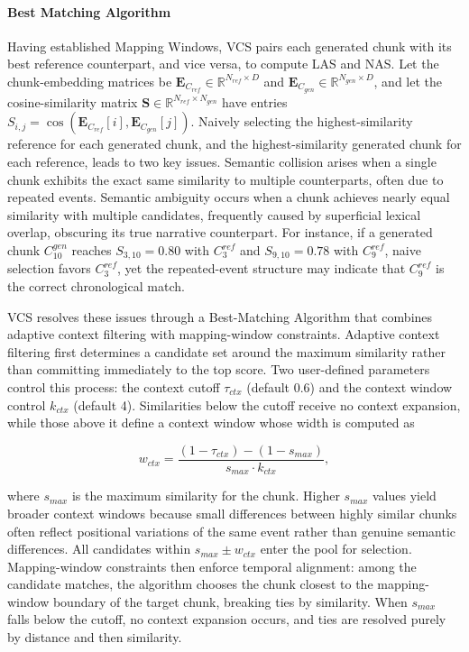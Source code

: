 \documentclass[letterpaper]{article} %
\begin{document}
\paragraph{Best Matching Algorithm}
Having established Mapping Windows, VCS pairs each generated chunk with its best reference counterpart, and vice versa, to compute LAS and NAS. Let the chunk-embedding matrices be $\mathbf{E}_{C_{ref}} \in \mathbb{R}^{N_{ref} \times D}$ and $\mathbf{E}_{C_{gen}} \in \mathbb{R}^{N_{gen} \times D}$, and let the cosine-similarity matrix $\mathbf{S} \in \mathbb{R}^{N_{ref} \times N_{gen}}$ have entries $S_{i,j} = \cos(\mathbf{E}_{C_{ref}}[i], \mathbf{E}_{C_{gen}}[j])$. Naively selecting the highest-similarity reference for each generated chunk, and the highest-similarity generated chunk for each reference, leads to two key issues. Semantic collision arises when a single chunk exhibits the exact same similarity to multiple counterparts, often due to repeated events. Semantic ambiguity occurs when a chunk achieves nearly equal similarity with multiple candidates, frequently caused by superficial lexical overlap, obscuring its true narrative counterpart. For instance, if a generated chunk $C_{10}^{gen}$ reaches $S_{3,10} = 0.80$ with $C_3^{ref}$ and $S_{9,10} = 0.78$ with $C_9^{ref}$, naive selection favors $C_3^{ref}$, yet the repeated-event structure may indicate that $C_9^{ref}$ is the correct chronological match.

VCS resolves these issues through a Best-Matching Algorithm that combines adaptive context filtering with mapping-window constraints. Adaptive context filtering first determines a candidate set around the maximum similarity rather than committing immediately to the top score. Two user-defined parameters control this process: the context cutoff $\tau_{ctx}$ (default 0.6) and the context window control $k_{ctx}$ (default 4). Similarities below the cutoff receive no context expansion, while those above it define a context window whose width is computed as

\begin{equation}
w_{ctx} = \frac{(1-\tau_{ctx})-(1-s_{max})}{s_{max} \cdot k_{ctx}},
\end{equation}

where $s_{max}$ is the maximum similarity for the chunk. Higher $s_{max}$ values yield broader context windows because small differences between highly similar chunks often reflect positional variations of the same event rather than genuine semantic differences. All candidates within $s_{max} \pm w_{ctx}$ enter the pool for selection. Mapping-window constraints then enforce temporal alignment: among the candidate matches, the algorithm chooses the chunk closest to the mapping-window boundary of the target chunk, breaking ties by similarity. When $s_{max}$ falls below the cutoff, no context expansion occurs, and ties are resolved purely by distance and then similarity.
\end{document}

